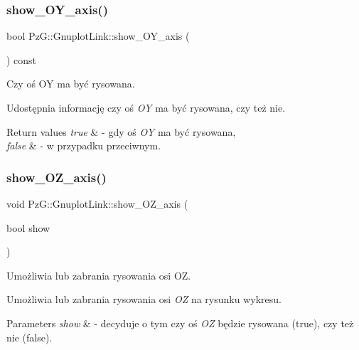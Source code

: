 \subsubsection{\texorpdfstring{show\+\_\+\+O\+Y\+\_\+axis()}{show\_OY\_axis()}\hspace{0.1cm}{\footnotesize\ttfamily [2/2]}}
{\footnotesize\ttfamily bool Pz\+G\+::\+Gnuplot\+Link\+::show\+\_\+\+O\+Y\+\_\+axis (\begin{DoxyParamCaption}{ }\end{DoxyParamCaption}) const\hspace{0.3cm}{\ttfamily [inline]}}



Czy oś OY ma być rysowana. 

Udostępnia informację czy oś {\itshape OY} ma być rysowana, czy też nie. 
\begin{DoxyRetVals}{Return values}
{\em true} & -\/ gdy oś {\itshape OY} ma być rysowana, \\
\hline
{\em false} & -\/ w przypadku przeciwnym. \\
\hline
\end{DoxyRetVals}
\mbox{\label{class_pz_g_1_1_gnuplot_link_ab4e8078f7c63779d5f4c21f22608d3ef}} 
\subsubsection{\texorpdfstring{show\+\_\+\+O\+Z\+\_\+axis()}{show\_OZ\_axis()}\hspace{0.1cm}{\footnotesize\ttfamily [1/2]}}
{\footnotesize\ttfamily void Pz\+G\+::\+Gnuplot\+Link\+::show\+\_\+\+O\+Z\+\_\+axis (\begin{DoxyParamCaption}\item[{bool}]{show }\end{DoxyParamCaption})\hspace{0.3cm}{\ttfamily [inline]}}



Umożliwia lub zabrania rysowania osi OZ. 

Umożliwia lub zabrania rysowania osi {\itshape OZ} na rysunku wykresu. 
\begin{DoxyParams}{Parameters}
{\em show} & -\/ decyduje o tym czy oś {\itshape OZ} będzie rysowana ({\ttfamily true}), czy też nie ({\ttfamily false}). \\
\hline
\end{DoxyParams}
\mbox{\label{class_pz_g_1_1_gnuplot_link_ab8f4938d56867a42b14f190a5000f8c8}} 
